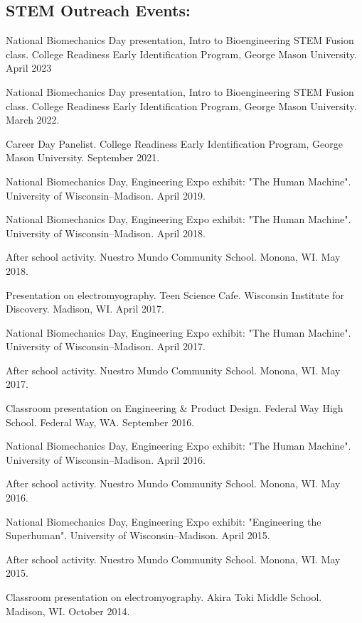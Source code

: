 \documentclass[letterpaper, 10pt]{article}
\begin{document}
\subsection{STEM Outreach Events:}
\begin{compactenum}
    \item National Biomechanics Day presentation, Intro to Bioengineering STEM Fusion class. College Readiness Early Identification Program, George Mason University. April 2023
    \item National Biomechanics Day presentation, Intro to Bioengineering STEM Fusion class. College Readiness Early Identification Program, George Mason University. March 2022.
    \item Career Day Panelist. College Readiness Early Identification Program, George Mason University. September 2021.
    \item National Biomechanics Day, Engineering Expo exhibit: "The Human Machine". University of Wisconsin–Madison. April 2019. 
    \item National Biomechanics Day, Engineering Expo exhibit: "The Human Machine". University of Wisconsin–Madison. April 2018. 
    \item After school activity. Nuestro Mundo Community School. Monona, WI. May 2018.
    \item Presentation on electromyography. Teen Science Cafe. Wisconsin Institute for Discovery. Madison, WI. April 2017.
    \item National Biomechanics Day, Engineering Expo exhibit: "The Human Machine". University of Wisconsin–Madison. April 2017.
    \item After school activity. Nuestro Mundo Community School. Monona, WI. May 2017.
    \item Classroom presentation on Engineering \& Product Design. Federal Way High School. Federal Way, WA. September 2016.
    \item National Biomechanics Day, Engineering Expo exhibit: "The Human Machine". University of Wisconsin–Madison. April 2016.
    \item After school activity. Nuestro Mundo Community School. Monona, WI. May 2016.
    \item National Biomechanics Day, Engineering Expo exhibit: "Engineering the Superhuman". University of Wisconsin–Madison. April 2015.
    \item After school activity. Nuestro Mundo Community School. Monona, WI. May 2015.
    \item Classroom presentation on electromyography. Akira Toki Middle School. Madison, WI. October 2014. 
\end{compactenum}
\end{document}
